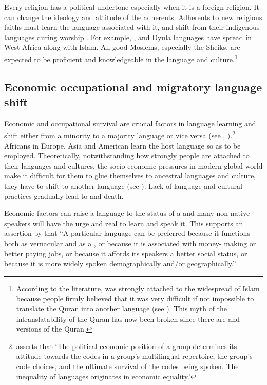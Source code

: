 \documentclass[output=paper,
modfonts
]{langscibook}
\begin{document}
Every religion has a political undertone especially when it is a foreign religion. It can change the ideology and attitude of the adherents. Adherents to new religious faiths must learn the language associated with it, and shift from their indigenous languages during worship \citep[447--448]{Brenzinger2009}. For example, ,  and Dyula languages have spread in West Africa along with Islam. All good Moslems, especially the Sheiks, are expected to be proficient and knowledgeable in the  language and culture.\footnote{According to the literature,  was strongly attached to the widespread of Islam because people firmly believed that it was very difficult if not impossible to translate the Quran into another language (see \citealt[208]{SavilleTroike1989}). This myth of the intranslatability of the Quran has now been broken since there are  and  versions of the Quran.}  

\subsection{Economic occupational and migratory language shift}

Economic and occupational survival are crucial factors in language learning and shift either from a minority to a majority language or vice versa (see \citealt[194]{Salzmann2004}, \citealt[58]{Holmes2001}).\footnote{\citet[485--486]{Philips2006} asserts that ‘The political economic position of a group determines its attitude towards the codes in a group’s multilingual repertoire, the group’s code choices, and the ultimate survival of the codes being spoken. The inequality of languages originates in economic equality.’} Africans in Europe, Asia and American learn the host language so as to be employed. Theoretically, notwithstanding how strongly people are attached to their languages and cultures, the socio-economic pressures in modern global world make it difficult for them to glue themselves to ancestral languages and culture, they have to shift to another language (see \citealt[190]{Mufwene2002}). Lack of language and cultural practices gradually lead to  and death.

Economic factors can raise a language to the status of a  and many non-native speakers will have the urge and zeal to learn and speak it. This supports an assertion by \citet[130]{Mufwene2006} that “A particular language can be preferred because it functions both as vernacular and as a , or because it is associated with money- making or better paying jobs, or because it affords its speakers a better social status, or because it is more widely spoken demographically and/or geographically.” 
\end{document}
